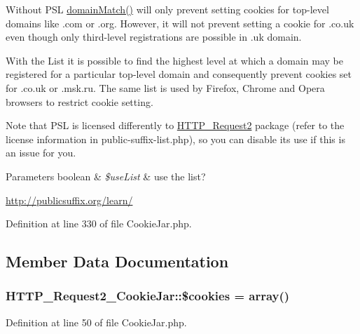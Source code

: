 Without P\+S\+L \hyperlink{classHTTP__Request2__CookieJar_ad22bee9ce6d2c111120bf44c3e302401}{domain\+Match()} will only prevent setting cookies for top-\/level domains like \textquotesingle{}.com\textquotesingle{} or \textquotesingle{}.org\textquotesingle{}. However, it will not prevent setting a cookie for \textquotesingle{}.co.\+uk\textquotesingle{} even though only third-\/level registrations are possible in .uk domain.

With the List it is possible to find the highest level at which a domain may be registered for a particular top-\/level domain and consequently prevent cookies set for \textquotesingle{}.co.\+uk\textquotesingle{} or \textquotesingle{}.msk.\+ru\textquotesingle{}. The same list is used by Firefox, Chrome and Opera browsers to restrict cookie setting.

Note that P\+S\+L is licensed differently to \hyperlink{classHTTP__Request2}{H\+T\+T\+P\+\_\+\+Request2} package (refer to the license information in public-\/suffix-\/list.\+php), so you can disable its use if this is an issue for you.


\begin{DoxyParams}[1]{Parameters}
boolean & {\em \$use\+List} & use the list?\\
\hline
\end{DoxyParams}
\hyperlink{}{http\+://publicsuffix.\+org/learn/}

Definition at line 330 of file Cookie\+Jar.\+php.



\subsection{Member Data Documentation}
\hypertarget{classHTTP__Request2__CookieJar_ab7bfdc0aa06d9b09b8050cfbdb1afacf}{}
\subsubsection[{\$cookies}]{\setlength{\rightskip}{0pt plus 5cm}H\+T\+T\+P\+\_\+\+Request2\+\_\+\+Cookie\+Jar\+::\$cookies = array()\hspace{0.3cm}{\ttfamily [protected]}}\label{classHTTP__Request2__CookieJar_ab7bfdc0aa06d9b09b8050cfbdb1afacf}


Definition at line 50 of file Cookie\+Jar.\+php.

